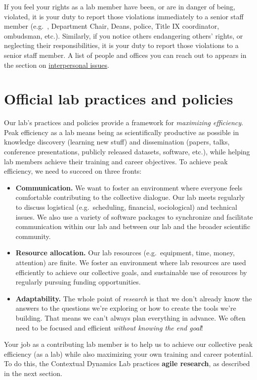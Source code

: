 \documentclass{tufte-book} %
\begin{document}

\noindent If you feel your rights as a lab member have been, or are in
danger of being, violated, it is your duty to report those violations
immediately to a senior staff member (e.g.\ \director, Department
Chair, Deans, police, Title IX coordinator, ombudsman, etc.).
Similarly, if you notice others endangering others' rights, or
neglecting their responsibilities, it is your duty to report those
violations to a senior staff member.  A list of people and offices
you can reach out to appears in the section on
\hyperref[sec:interpersonal]{interpersonal issues}.

\chapter{Official lab practices and policies}\label{ch:policy}
Our lab's practices and policies provide a framework
for \textit{maximizing efficiency}.  Peak efficiency as
a lab means being as scientifically productive as possible
in knowledge discovery (learning new stuff) and dissemination
(papers, talks, conference presentations, publicly released datasets,
software, etc.), while helping lab members achieve
their training and career objectives.  To achieve peak
efficiency, we need to succeed on three fronts:
\begin{itemize}
\item \textbf{Communication.}  We want to foster an environment where
  everyone feels comfortable contributing to the collective dialogue.
  Our lab meets regularly to discuss logistical (e.g.\ scheduling, financial,
  sociological) and technical issues.  We also use a variety of
  software packages to synchronize and facilitate communication within
  our lab and between our lab and the broader scientific community.
\item \textbf{Resource allocation.}   Our lab resources (e.g.\
  equipment, time, money, attention) are finite.  We foster an
  environment where lab resources are used efficiently
  to achieve our collective goals, and
  sustainable use of resources by regularly pursuing funding opportunities.
\item \textbf{Adaptability.}  The whole point of \textit{research} is that we
  don't already know the answers to the questions we're exploring or
  how to create the tools we're building.  That means we can't
  always plan everything in advance.  We often need to
  be focused and efficient \textit{without knowing the end goal}!
\end{itemize}
Your job as a contributing lab member is to help us to achieve our
collective peak efficiency (as a lab) while also maximizing your own
training and career potential.  To do this, the Contextual Dynamics
Lab practices \textbf{agile research}, as described in the next section.
\end{document}

